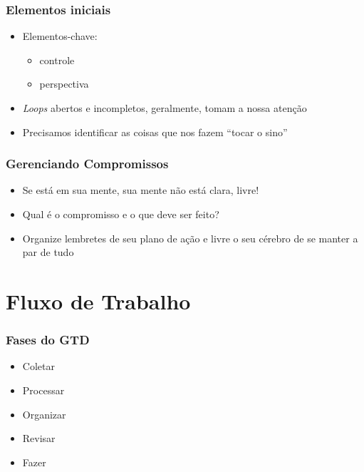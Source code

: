 \documentclass{beamer}
\begin{document}
\begin{frame}[t]\frametitle{Elementos iniciais}
\begin{itemize}
	\item Elementos-chave:
	\begin{itemize}
		\item controle
		\item perspectiva
	\end{itemize}
	\item \textit{Loops} abertos e incompletos, geralmente, tomam a nossa atenção 
	\item Precisamos identificar as coisas que nos fazem ``tocar o sino''
\end{itemize}
\end{frame}

\begin{frame}[t]\frametitle{Gerenciando Compromissos}
\begin{itemize}
	\item Se está em sua mente, sua mente não está clara, livre!
	\item Qual é o compromisso e o que deve ser feito?
	\item Organize lembretes de seu plano de ação e livre o seu cérebro de se manter a par de tudo
\end{itemize}
\end{frame}

\section{Fluxo de Trabalho}

\begin{frame}[t]\frametitle{Fases do GTD}
    \begin{itemize}
    	\item Coletar
    	\item Processar
    	\item Organizar
    	\item Revisar
    	\item Fazer

    \end{itemize}
\end{frame}
\end{document}

